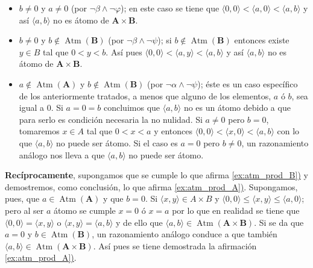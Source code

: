 \begin{solution}
\begin{itemize}
\item $b\neq 0$ y $a\neq 0$ (por $\neg\beta\wedge\neg\varphi$); en
  este caso se tiene que
  $\langle 0,0\rangle<\langle a,0\rangle<\langle a,b\rangle$ y
  así $\langle a,b\rangle$ no es átomo de $\mathbf{A}\times\mathbf{B}$.
\item $b\neq 0$ y $b\notin \operatorname{Atm}(\mathbf{B})$
  (por $\neg\beta\wedge\neg\psi$); si
  $b\notin\operatorname{Atm}(\mathbf{B})$ entonces existe $y\in B$ tal
  que $0<y<b$. Así pues
  $\langle 0,0\rangle<\langle a,y\rangle<\langle a,b\rangle$ y
  así $\langle a,b\rangle$ no es átomo de
  $\mathbf{A}\times\mathbf{B}$.
\item $a\notin\operatorname{Atm}(\mathbf{A})$ y
  $b\notin \operatorname{Atm}(\mathbf{B})$ (por
  $\neg\alpha\wedge\neg\psi$); éste es un caso específico de los
  anteriormente tratados, a menos que alguno de los elementos, $a$ ó
  $b$, sea igual a $0$. Si $a=0=b$ concluimos que $\langle a,b\rangle$
  no es un átomo debido a que para serlo es condición necesaria la no
  nulidad. Si $a\neq 0$ pero $b=0$, tomaremos $x\in A$ tal que $0<x<a$
  y entonces
  $\langle 0,0\rangle<\langle x,0\rangle<\langle a,b\rangle$ con lo
  que $\langle a,b\rangle$ no puede ser átomo. Si el caso es $a=0$
  pero $b\neq 0$, un razonamiento análogo nos lleva a que
  $\langle a,b\rangle$ no puede ser átomo.
\end{itemize}
\textbf{Recíprocamente}, supongamos que se cumple lo que afirma
\hyperref[ex:atm_prod_B]{\ref*{ex:atm_prod_B})} y demostremos, como
conclusión, lo que afirma
\hyperref[ex:atm_prod_A]{\ref*{ex:atm_prod_A})}. Supongamos, pues, que
$a\in \operatorname{Atm}(\mathbf{A})$ y que $b=0$. Si
$\langle x,y\rangle\in A\times B$ y
$\langle 0,0\rangle\leq\langle x,y\rangle\leq\langle a,0\rangle$; pero
al ser $a$ átomo se cumple $x=0$ ó $x=a$ por lo que en realidad se
tiene que $\langle 0,0\rangle=\langle x,y\rangle$ o
$\langle x,y\rangle=\langle a,b\rangle$ y de ello que
$\langle a,b\rangle\in
\operatorname{Atm}(\mathbf{A}\times\mathbf{B})$. Si se da que $a=0$ y
$b\in \operatorname{Atm}(\mathbf{B})$, un razonamiento análogo conduce
a que también
$\langle a,b\rangle\in
\operatorname{Atm}(\mathbf{A}\times\mathbf{B})$. Así pues se tiene
demostrada la afirmación
\hyperref[ex:atm_prod_A]{\ref*{ex:atm_prod_A})}.
\end{solution}

